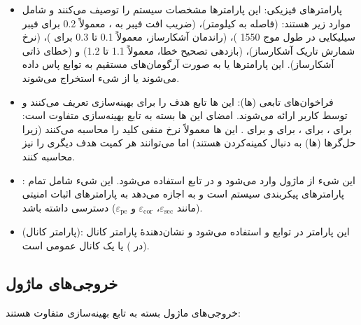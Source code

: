\begin{itemize}
	\item پارامترهای فیزیکی: این پارامترها مشخصات سیستم  را توصیف می‌کنند و شامل موارد زیر هستند:  (فاصله به کیلومتر)،  (ضریب افت فیبر به ، معمولاً 0.2 برای فیبر سیلیکایی در طول موج 1550 )،  (راندمان آشکارساز، معمولاً 0.1 تا 0.3 برای )،  (نرخ شمارش تاریک آشکارساز)،  (بازدهی تصحیح خطا، معمولاً 1.1 تا 1.2) و  (خطای ذاتی آشکارساز). این پارامترها یا به صورت آرگومان‌های مستقیم به توابع پاس داده می‌شوند یا از شیء  استخراج می‌شوند.
	\item فراخوان‌های تابعی (ها): این ‌ها تابع هدف را برای بهینه‌سازی تعریف می‌کنند و توسط کاربر ارائه می‌شوند. امضای این ‌ها بسته به تابع بهینه‌سازی متفاوت است:  برای ،  برای ،  برای  و  برای . این ‌ها معمولاً نرخ منفی کلید را محاسبه می‌کنند (زیرا حل‌گرها (ها) به دنبال کمینه‌کردن هستند) اما می‌توانند هر کمیت هدف دیگری را نیز محاسبه کنند.
	\item {}: این شیء از ماژول  وارد می‌شود و در تابع  استفاده می‌شود. این شیء شامل تمام پارامترهای پیکربندی سیستم است و به  اجازه می‌دهد به پارامترهای اثبات امنیتی (مانند $\varepsilon_{\text{sec}}$، $\varepsilon_{\text{cor}}$ و $\varepsilon_{\text{pe}}$) دسترسی داشته باشد.
	\item {} (پارامتر کانال): این پارامتر در توابع  و  استفاده می‌شود و نشان‌دهندۀ پارامتر کانال  (در ) یا یک کانال عمومی است.
\end{itemize}

\subsection{خروجی‌های ماژول}

خروجی‌های ماژول بسته به تابع بهینه‌سازی متفاوت هستند:


